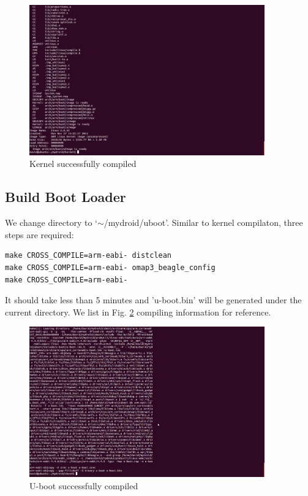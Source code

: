 \documentclass[10pt,journal,draftclsnofoot,onecolumn]{IEEEtran}
\begin{document}
\begin{figure}[ht]
	\centering
	\includegraphics[width=4in]{./figs/kernel.png}
	\caption{Kernel successfully compiled}
	\label{kernel}
\end{figure}


\subsection{Build Boot Loader}
We change directory to `$\sim$/mydroid/uboot'. Similar to kernel compilaton, three steps are required:

\begin{lstlisting}[language={make}]
make CROSS_COMPILE=arm-eabi- distclean
make CROSS_COMPILE=arm-eabi- omap3_beagle_config
make CROSS_COMPILE=arm-eabi-
\end{lstlisting}

It should take less than 5 minutes and 'u-boot.bin' will be generated under the current directory. We list in Fig. \ref{uboot} compiling information for reference.

\begin{figure}[ht]
	\centering
	\includegraphics[width=4in]{./figs/uboot.png}
	\caption{U-boot successfully compiled}
	\label{uboot}
\end{figure}
\end{document}
